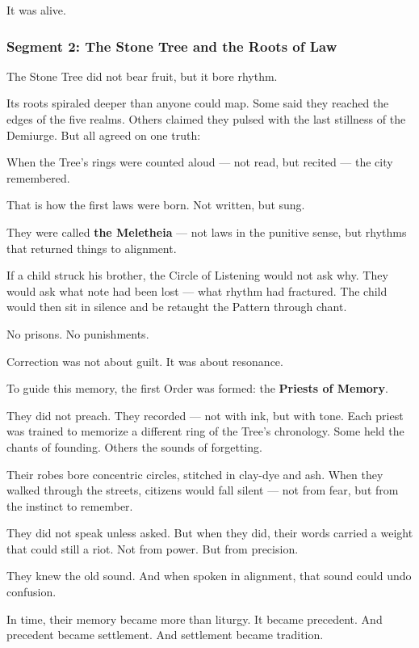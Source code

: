 \documentclass[9pt]{article}
\begin{document}
It was alive.

\newpage

\subsubsection*{Segment 2: The Stone Tree and the Roots of Law}

The Stone Tree did not bear fruit, but it bore rhythm.

Its roots spiraled deeper than anyone could map.  
Some said they reached the edges of the five realms.  
Others claimed they pulsed with the last stillness of the Demiurge.  
But all agreed on one truth:

When the Tree’s rings were counted aloud — not read, but recited —  
the city remembered.

That is how the first laws were born.  
Not written, but sung.

They were called \textbf{the Meletheia} — not laws in the punitive sense,  
but rhythms that returned things to alignment.

If a child struck his brother, the Circle of Listening would not ask why.  
They would ask what note had been lost — what rhythm had fractured.  
The child would then sit in silence and be retaught the Pattern through chant.

No prisons.  
No punishments.

Correction was not about guilt.  
It was about resonance.

To guide this memory, the first Order was formed:  
the \textbf{Priests of Memory}.

They did not preach.  
They recorded — not with ink, but with tone.  
Each priest was trained to memorize a different ring of the Tree’s chronology.  
Some held the chants of founding.  
Others the sounds of forgetting.

Their robes bore concentric circles, stitched in clay-dye and ash.  
When they walked through the streets, citizens would fall silent —  
not from fear,  
but from the instinct to remember.

They did not speak unless asked.  
But when they did, their words carried a weight that could still a riot.  
Not from power.  
But from precision.

They knew the old sound.  
And when spoken in alignment, that sound could undo confusion.

In time, their memory became more than liturgy.  
It became precedent.  
And precedent became settlement.  
And settlement became tradition.
\end{document}
